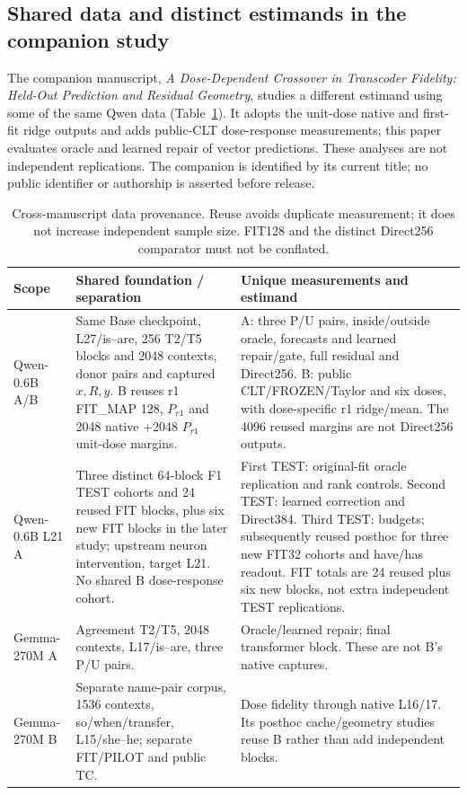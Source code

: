 \subsection{Shared data and distinct estimands in the companion study}
The companion manuscript, \emph{A Dose-Dependent Crossover in Transcoder Fidelity: Held-Out Prediction and Residual Geometry}, studies a different estimand using some of the same Qwen data (Table~\ref{tab:shared}). It adopts the unit-dose native and first-fit ridge outputs and adds public-CLT dose-response measurements; this paper evaluates oracle and learned repair of vector predictions. These analyses are not independent replications. The companion is identified by its current title; no public identifier or authorship is asserted before release.
\begin{table}[ht]\centering\scriptsize\setlength{\tabcolsep}{4pt}
\begin{tabular}{>{\raggedright\arraybackslash}p{}>{\raggedright\arraybackslash}p{}>{\raggedright\arraybackslash}p{}}
\toprule Scope & Shared foundation / separation & Unique measurements and estimand\\\midrule
Qwen-0.6B A/B & Same Base checkpoint, L27/is--are, 256 T2/T5 blocks and 2048 contexts, donor pairs and captured $x,R,y$. B reuses r1 FIT\_MAP 128, $P_{r1}$ and 2048 native +2048 $P_{r1}$ unit-dose margins. & A: three P/U pairs, inside/outside oracle, forecasts and learned repair/gate, full residual and Direct256. B: public CLT/FROZEN/Taylor and six doses, with dose-specific r1 ridge/mean. The 4096 reused margins are not Direct256 outputs.\\[3pt]
Qwen-0.6B L21 A & Three distinct 64-block F1 TEST cohorts and 24 reused FIT blocks, plus six new FIT blocks in the later study; upstream neuron intervention, target L21. No shared B dose-response cohort. & First TEST: original-fit oracle replication and rank controls. Second TEST: learned correction and Direct384. Third TEST: budgets; subsequently reused posthoc for three new FIT32 cohorts and have/has readout. FIT totals are 24 reused plus six new blocks, not extra independent TEST replications.\\[3pt]
Gemma-270M A & Agreement T2/T5, 2048 contexts, L17/is--are, three P/U pairs. & Oracle/learned repair; final transformer block. These are not B's native captures.\\[3pt]
Gemma-270M B & Separate name-pair corpus, 1536 contexts, so/when/transfer, L15/she--he; separate FIT/PILOT and public TC. & Dose fidelity through native L16/17. Its posthoc cache/geometry studies reuse B rather than add independent blocks.\\
\bottomrule\end{tabular}
\caption{Cross-manuscript data provenance. Reuse avoids duplicate measurement; it does not increase independent sample size. FIT128 and the distinct Direct256 comparator must not be conflated.}\label{tab:shared}
\end{table}

